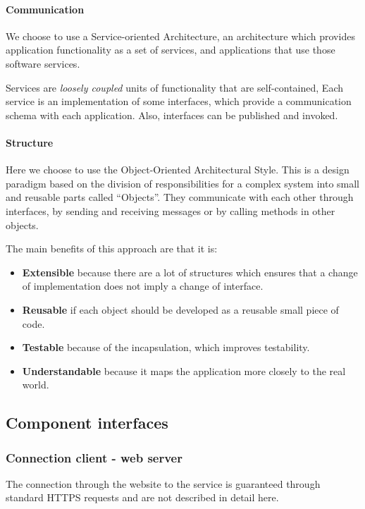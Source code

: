 \paragraph{Communication} We choose to use a Service-oriented Architecture, 
an architecture which provides application functionality as a set of services, 
and applications that use those software services. 

Services are \textit{loosely coupled} units of functionality that are self-contained, 
Each service is an implementation of some interfaces, which provide a communication schema with
each application. Also, interfaces can be published and invoked.

\paragraph{Structure} Here we choose to use the Object-Oriented Architectural Style.
This is a design paradigm based on the division of responsibilities for a complex system
into small and reusable parts called ``Objects''.
They communicate with each other through interfaces, by sending and receiving messages
or by calling methods in other objects.

The main benefits of this approach are that it is:

\begin{itemize}
    \item{\textbf{Extensible} because there are a lot of structures which ensures that a change of implementation does not imply a change of interface.}
    \item{\textbf{Reusable} if each object should be developed as a reusable small piece of code.}
    \item{\textbf{Testable} because of the incapsulation, which improves testability.}
    \item{\textbf{Understandable} because it maps the application more closely to the real world.}
\end{itemize}

\newpage
\subsection{Component interfaces}
\label{sub:component_interfaces}

\subsubsection{Connection client - web server} %
\label{ssub:https}
The connection through the website to the service is guaranteed through standard HTTPS requests and are not described in detail here.

